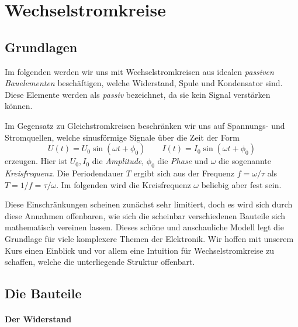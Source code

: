 \section{Wechselstromkreise}
\subsection{Grundlagen}
Im folgenden werden wir uns mit Wechselstromkreisen aus idealen \emph{passiven Bauelementen} beschäftigen, welche Widerstand, Spule und Kondensator sind. Diese Elemente werden als \emph{passiv} bezeichnet, da sie kein Signal verstärken können.

Im Gegensatz zu Gleichstromkreisen beschränken wir uns auf Spannungs- und Stromquellen, welche sinusförmige Signale über die Zeit der Form
\begin{equation}\label{eq:sinusform}
    U(t) = U_0\sin(\omega t + \phi_0) \qquad
    I(t) = I_0\sin(\omega t + \phi_0)
\end{equation}
erzeugen. Hier ist $U_0, I_0$ die \emph{Amplitude}, $\phi_0$ die \emph{Phase} und  $\omega$ die sogenannte \emph{Kreisfrequenz}. Die Periodendauer $T$ ergibt sich aus der Frequenz $f = \omega/\tau$ als $T = 1/f = \tau/\omega$.
Im folgenden wird die Kreisfrequenz $\omega$ beliebig aber fest sein.

Diese Einschränkungen scheinen zunächst sehr limitiert, doch es wird sich durch diese Annahmen offenbaren, wie sich die scheinbar verschiedenen Bauteile sich mathematisch vereinen lassen. Dieses schöne und anschauliche Modell legt die Grundlage für viele komplexere Themen der Elektronik. Wir hoffen mit unserem Kurs einen Einblick und vor allem eine Intuition für Wechselstromkreise zu schaffen, welche die unterliegende Struktur offenbart.

\subsection{Die Bauteile}
\paragraph*{Der Widerstand}

